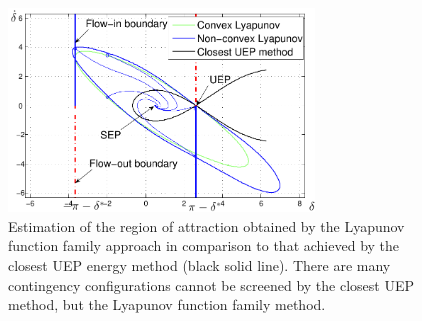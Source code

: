 \documentclass[final]{IEEEtran}
\begin{document}
\begin{figure}
\label{fig.2Bus} \centering
\includegraphics[width = 3.2in]{2Bus}
\caption{Estimation of the region of attraction  obtained
by the Lyapunov function family approach in comparison to that achieved by the closest UEP energy method (black solid line). There are many contingency configurations cannot be screened by the closest UEP method, but the Lyapunov function family method.}
\end{figure}
\end{document}
